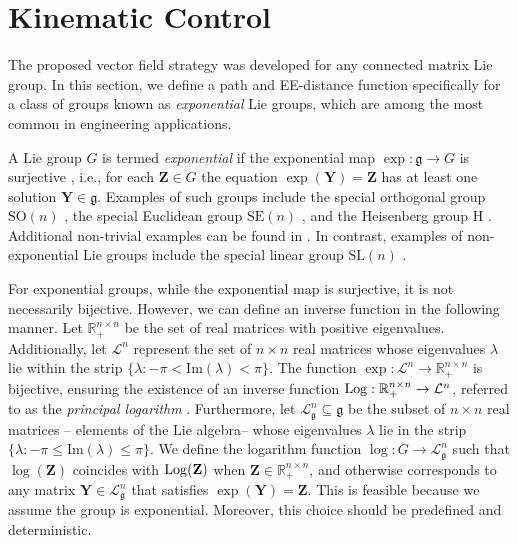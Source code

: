 \chapter{Kinematic Control}\label{ch:kinematic}
The proposed vector field strategy was developed for any connected matrix Lie group. In this section, we define a path and EE-distance function specifically for a class of groups known as \emph{exponential} Lie groups, which are among the most common in engineering applications.

A Lie group $G$ is termed \emph{exponential} if the exponential map $\exp:\mathfrak{g}\to G$ is surjective \citep{djokovic1995exponential}, i.e., for each $\mathbf{Z}\in G$ the equation $\exp(\mathbf{Y}) = \mathbf{Z}$ has at least one solution $\mathbf{Y}\in\mathfrak{g}$. Examples of such groups include the special orthogonal group $\text{SO}(n)$ \citep[p. 28]{Gallier2020}, the special Euclidean  group $\text{SE}(n)$ \citep[p. 42]{Gallier2020}, and the Heisenberg group $\text{H}$ \citep[p. 75]{Hall2015}. Additional non-trivial examples can be found in \citet{djokovic1995exponential}. In contrast, examples of non-exponential Lie groups include the special linear group $\text{SL}(n)$ \citep[p. 28]{Gallier2020}.

For exponential groups, while the exponential map is surjective, it is not necessarily bijective. However, we can define an inverse function in the following manner. Let $\mathbb{R}_+^{n\times n}$ be the set of real matrices with positive eigenvalues. Additionally, let $\mathcal{L}^n$ represent the set of $n\times n$ real matrices whose eigenvalues $\lambda$ lie within the strip $\{\lambda : -\pi < \text{Im}(\lambda) < \pi\}$. The function $\exp:\mathcal{L}^n\to\mathbb{R}_+^{n\times n}$ is bijective, ensuring the existence of an inverse function $\operatorname{Log}: \mathbb{R}_+^{n\times n} \to \mathcal{L}^n$, referred to as the \emph{principal logarithm} \citep[p. 319]{Gallier2020}. Furthermore, let $\mathcal{L}_{\mathfrak{g}}^n\subseteq\mathfrak{g}$ be the subset of $n \times n$ real matrices -- elements of the Lie algebra-- whose eigenvalues $\lambda$ lie in the strip $\{\lambda : -\pi \le \text{Im}(\lambda) \le \pi\}$. We define the logarithm function $\log:G\to\mathcal{L}_{\mathfrak{g}}^n$ such that $\log(\mathbf{Z})$ coincides with $\operatorname{Log}(\mathbf{Z})$ when $\mathbf{Z}\in\mathbb{R}_+^{n\times n}$, and otherwise corresponds to any matrix $\mathbf{Y}\in\mathcal{L}_{\mathfrak{g}}^n$ that satisfies $\exp(\mathbf{Y}) = \mathbf{Z}$. This is feasible because we assume the group is exponential. Moreover, this choice should be predefined and deterministic.

